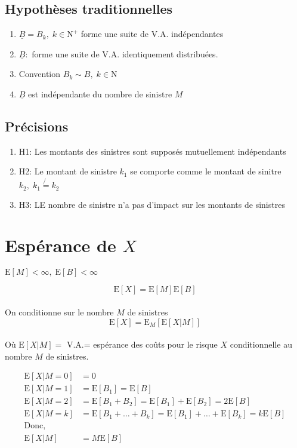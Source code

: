 \documentclass[]{book}
\theoremstyle{definition}
\theoremstyle{definition}
\theoremstyle{definition}
\theoremstyle{remark}
\begin{document}
\subsection{Hypothèses
traditionnelles}\label{hypotheses-traditionnelles}

\begin{enumerate}
\item $\underline{B}=B_k,\;k\in \mathrm{N}^+$ forme une suite de V.A. indépendantes    
\item $\underline{B}:$ forme une suite de V.A. identiquement distribuées.   
\item Convention $B_k \sim B,\; k \in \mathrm{N}$   
\item $\underline{B}$ est indépendante du nombre de sinistre $M$    
\end{enumerate}

\subsection*{Précisions}\label{precisions}

\begin{enumerate}
\item H1: Les montants des sinistres sont supposés mutuellement indépendants    
\item H2: Le montant de sinistre $k_1$ se comporte comme le montant de sinitre $k_2,\;k_1 \not{=} k_2$  
\item H3: LE nombre de sinistre n'a pas d'impact sur les montants de sinistres  
\end{enumerate}

\section{\texorpdfstring{Espérance de
\(X\)}{Espérance de X}}\label{esperance-de-x}

\(\text{E}[M]<\infty,\; \text{E}[B]<\infty\)

\[\text{E}[X]=\text{E}[M]\text{E}[B]\]\\
On conditionne sur le nombre \(M\) de sinistres \[
\text{E}[X]=\text{E}_M\left[\text{E}[X|M]\right]
\]\\
Où \(\text{E}[X|M]=\) V.A.= espérance des coûts pour le risque \(X\)
conditionnelle au nombre \(M\) de sinistres.

\begin{align*}
\text{E}[X|M=0]& =0\\
\text{E}[X|M=1]& = \text{E}[B_1]=\text{E}[B]\\
\text{E}[X|M=2]& = \text{E}[B_1+B_2]=\text{E}[B_1]+\text{E}[B_2]=2\text{E}[B]\\
\text{E}[X|M=k]& = \text{E}[B_1+\dots+B_k]=\text{E}[B_1]+\dots+\text{E}[B_k]=k\text{E}[B]\\
\text{Donc,}\\
\text{E}[X|M]& =M\text{E}[B]
\end{align*}
\end{document}
